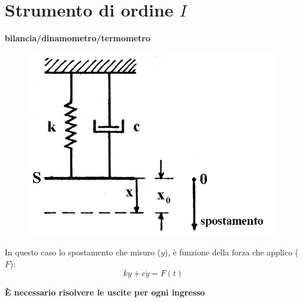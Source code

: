 \documentclass[a4paper, 15pt]{article}
\begin{document}
\section{Strumento di ordine $I$}
\begin{adjustwidth}{2in}{}	
	\textbf{bilancia/dinamometro/termometro} 
	\begin{figure}[H]
		\centering
		\includegraphics[width=0.5\linewidth]{fig/imag1}
		\label{fig:imag1}
	\end{figure}	
	In questo caso lo spostamento che misuro ($y$), è funzione della forza che applico ($F$):
	\[ ky + c\dot{y} = F(t)\]
	
	\begin{center}
		\textbf{È necessario risolvere le uscite per ogni ingresso}
	\end{center}
\end{adjustwidth}
\end{document}
